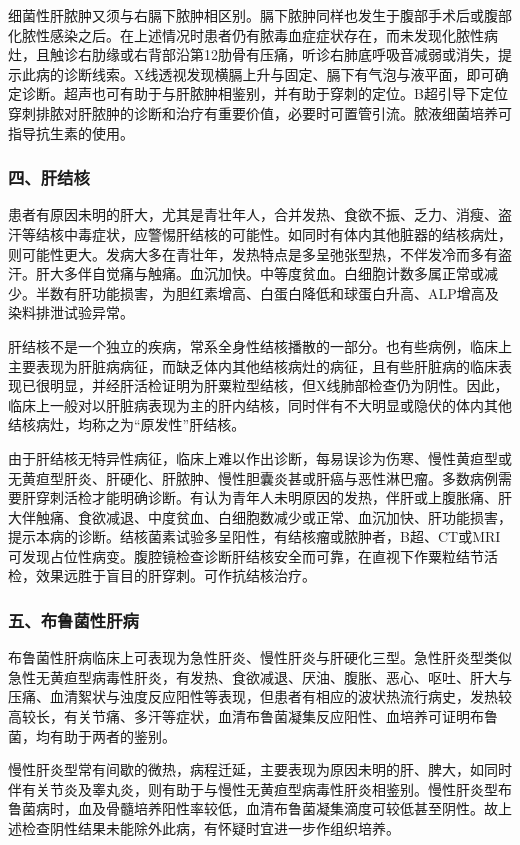 细菌性肝脓肿又须与右膈下脓肿相区别。膈下脓肿同样也发生于腹部手术后或腹部化脓性感染之后。在上述情况时患者仍有脓毒血症症状存在，而未发现化脓性病灶，且触诊右肋缘或右背部沿第12肋骨有压痛，听诊右肺底呼吸音减弱或消失，提示此病的诊断线索。X线透视发现横膈上升与固定、膈下有气泡与液平面，即可确定诊断。超声也可有助于与肝脓肿相鉴别，并有助于穿刺的定位。B超引导下定位穿刺排脓对肝脓肿的诊断和治疗有重要价值，必要时可置管引流。脓液细菌培养可指导抗生素的使用。

\subsubsection{四、肝结核}

患者有原因未明的肝大，尤其是青壮年人，合并发热、食欲不振、乏力、消瘦、盗汗等结核中毒症状，应警惕肝结核的可能性。如同时有体内其他脏器的结核病灶，则可能性更大。发病大多在青壮年，发热特点是多呈弛张型热，不伴发冷而多有盗汗。肝大多伴自觉痛与触痛。血沉加快。中等度贫血。白细胞计数多属正常或减少。半数有肝功能损害，为胆红素增高、白蛋白降低和球蛋白升高、ALP增高及染料排泄试验异常。

肝结核不是一个独立的疾病，常系全身性结核播散的一部分。也有些病例，临床上主要表现为肝脏病病征，而缺乏体内其他结核病灶的病征，且有些肝脏病的临床表现已很明显，并经肝活检证明为肝粟粒型结核，但X线肺部检查仍为阴性。因此，临床上一般对以肝脏病表现为主的肝内结核，同时伴有不大明显或隐伏的体内其他结核病灶，均称之为“原发性”肝结核。

由于肝结核无特异性病征，临床上难以作出诊断，每易误诊为伤寒、慢性黄疸型或无黄疸型肝炎、肝硬化、肝脓肿、慢性胆囊炎甚或肝癌与恶性淋巴瘤。多数病例需要肝穿刺活检才能明确诊断。有认为青年人未明原因的发热，伴肝或上腹胀痛、肝大伴触痛、食欲减退、中度贫血、白细胞数减少或正常、血沉加快、肝功能损害，提示本病的诊断。结核菌素试验多呈阳性，有结核瘤或脓肿者，B超、CT或MRI可发现占位性病变。腹腔镜检查诊断肝结核安全而可靠，在直视下作粟粒结节活检，效果远胜于盲目的肝穿刺。可作抗结核治疗。

\subsubsection{五、布鲁菌性肝病}

布鲁菌性肝病临床上可表现为急性肝炎、慢性肝炎与肝硬化三型。急性肝炎型类似急性无黄疸型病毒性肝炎，有发热、食欲减退、厌油、腹胀、恶心、呕吐、肝大与压痛、血清絮状与浊度反应阳性等表现，但患者有相应的波状热流行病史，发热较高较长，有关节痛、多汗等症状，血清布鲁菌凝集反应阳性、血培养可证明布鲁菌，均有助于两者的鉴别。

慢性肝炎型常有间歇的微热，病程迁延，主要表现为原因未明的肝、脾大，如同时伴有关节炎及睾丸炎，则有助于与慢性无黄疸型病毒性肝炎相鉴别。慢性肝炎型布鲁菌病时，血及骨髓培养阳性率较低，血清布鲁菌凝集滴度可较低甚至阴性。故上述检查阴性结果未能除外此病，有怀疑时宜进一步作组织培养。

